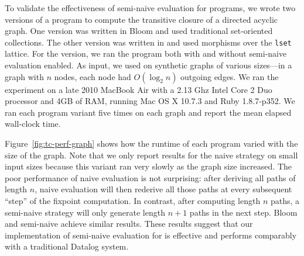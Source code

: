 To validate the effectiveness of semi-naive evaluation for \lang programs, we
wrote two versions of a program to compute the transitive closure of a directed
acyclic graph. One version was written in Bloom and used traditional
set-oriented collections. The other version was written in \lang and used
morphisms over the \texttt{lset} lattice. For the \lang version, we ran the
program both with and without semi-naive evaluation enabled. As input, we used
on synthetic graphs of various sizes---in a graph with $n$ nodes, each node had
$O(\log_2 n)$ outgoing edges. We ran the experiment on a late 2010
MacBook Air with a 2.13 Ghz Intel Core 2 Duo processor and 4GB of RAM, running
Mac OS X 10.7.3 and Ruby 1.8.7-p352. We ran each program variant five times on
each graph and report the mean elapsed wall-clock time.

Figure~\ref{fig:tc-perf-graph} shows how the runtime of each program varied with
the size of the graph. Note that we only report results for the naive \lang
strategy on small input sizes because this variant ran very slowly as the graph
size increased. The poor performance of naive evaluation is not surprising:
after deriving all paths of length $n$, naive evaluation will then rederive all
those paths at every subsequent ``step'' of the fixpoint computation. In
contrast, after computing length $n$ paths, a semi-naive strategy will only
generate length $n+1$ paths in the next step. Bloom and semi-naive \lang achieve
similar results. These results suggest that our implementation of semi-naive
evaluation for \lang is effective and performs comparably with a traditional
Datalog system.
